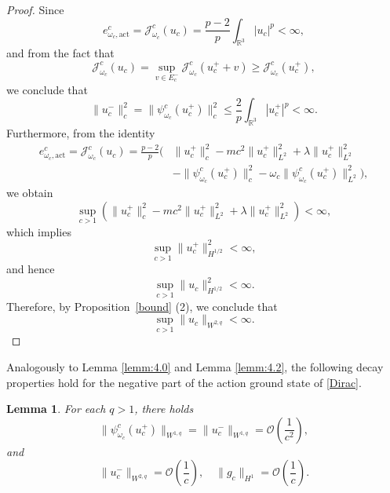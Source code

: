 \documentclass{amsart}
\theoremstyle{plain}
\newtheorem{lemma}[theorem]{Lemma}
\theoremstyle{definition}
\theoremstyle{remark}
\numberwithin{equation}{section} \numberwithin{figure}{section}
\begin{document}
\begin{proof}
  Since 
  \[
  e_{\omega_c, \text{act}}^c = \mathcal{J}^c_{\omega_c}(u_c) = \frac{p-2}{p} \int_{\mathbb{R}^3} |u_c|^p < \infty,
  \]
  and from the fact that
  \[
  \mathcal{J}^c_{\omega_c}(u_c) = \sup_{v \in E_c^-} \mathcal{J}^c_{\omega_c}(u_c^+ + v) \geq \mathcal{J}^c_{\omega_c}(u_c^+),
  \]
  we conclude that
  \[
 \|u_c^-\|_c^2= \|\psi_{\omega_c}^c(u_c^+)\|_c^2 \leq \frac{2}{p} \int_{\mathbb{R}^3} |u_c^+|^p < \infty.
  \]
  Furthermore, from the identity
  \begin{equation}
      \begin{split}
          e_{\omega_c, \text{act}}^c = \mathcal{J}^c_{\omega_c}(u_c) = \frac{p-2}{p} \Big( 
          &\|u_c^+\|_c^2 - mc^2 \|u_c^+\|_{L^2}^2 + \lambda \|u_c^+\|_{L^2}^2 \\
          &- \|\psi_{\omega_c}^c(u_c^+)\|_c^2 - \omega_c \|\psi_{\omega_c}^c(u_c^+)\|_{L^2}^2 \Big),
      \end{split}
  \end{equation}
  we obtain
  \[
  \sup_{c > 1} \left( \|u_c^+\|_c^2 - mc^2 \|u_c^+\|_{L^2}^2 + \lambda \|u_c^+\|_{L^2}^2 \right) < \infty,
  \]
  which implies
  \[
  \sup_{c > 1} \|u_c^+\|_{H^{1/2}}^2 < \infty,
  \]
  and hence
  \[
  \sup_{c > 1} \|u_c\|_{H^{1/2}}^2 < \infty.
  \]
  Therefore, by Proposition~\ref{bound} (2), we conclude that
  \[
  \sup_{c > 1} \|u_c\|_{W^{2,q}} < \infty.
  \]
\end{proof}
Analogously to Lemma \ref{lemm:4.0} and Lemma \ref{lemm:4.2}, the following decay properties hold for 
the negative part of the action ground state of \eqref{Dirac}.
\begin{lemma}\label{A_21}
  For each $q>1$, there holds
    $$\|\psi_{\omega_c}^c(u_c^+)\|_{W^{1,q}}= \|u_c^-\|_{W^{1,q}}= \mathcal{O}\left(\frac{1}{c^2}\right),$$
     and $$\| u_c^-\|_{W^{2,q}}= \mathcal{O}\left(\frac{1}{c}\right), \quad \|g_{c}\|_{H^1}=\mathcal{O}\left(\frac{1}{c}\right).$$
\end{lemma}
\end{document}
